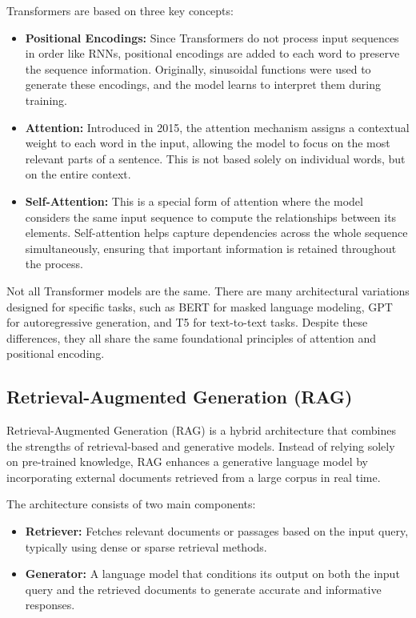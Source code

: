 Transformers are based on three key concepts:

\begin{itemize}
    \item \textbf{Positional Encodings:} Since Transformers do not process input sequences in order like RNNs, positional encodings are added to each word to preserve the sequence information. Originally, sinusoidal functions were used to generate these encodings, and the model learns to interpret them during training.

    \item \textbf{Attention:} Introduced in 2015, the attention mechanism assigns a contextual weight to each word in the input, allowing the model to focus on the most relevant parts of a sentence. This is not based solely on individual words, but on the entire context.

    \item \textbf{Self-Attention:} This is a special form of attention where the model considers the same input sequence to compute the relationships between its elements. Self-attention helps capture dependencies across the whole sequence simultaneously, ensuring that important information is retained throughout the process.
\end{itemize}

Not all Transformer models are the same. There are many architectural variations designed for specific tasks, such as BERT for masked language modeling, GPT for autoregressive generation, and T5 for text-to-text tasks. Despite these differences, they all share the same foundational principles of attention and positional encoding.

\subsection*{Retrieval-Augmented Generation (RAG)}

Retrieval-Augmented Generation (RAG) is a hybrid architecture that combines the strengths of retrieval-based and generative models. Instead of relying solely on pre-trained knowledge, RAG enhances a generative language model by incorporating external documents retrieved from a large corpus in real time.

The architecture consists of two main components:

\begin{itemize}
    \item \textbf{Retriever:} Fetches relevant documents or passages based on the input query, typically using dense or sparse retrieval methods.
    \item \textbf{Generator:} A language model that conditions its output on both the input query and the retrieved documents to generate accurate and informative responses.
\end{itemize}

